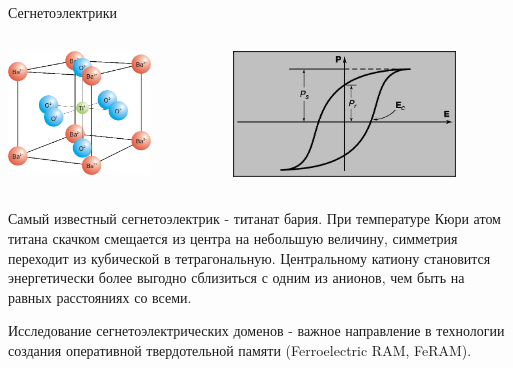 \documentclass[9pt, compress, xcolor=table]{beamer}
\begin{document}
\begin{frame}{Сегнетоэлектрики}
\begin{columns}
\column{6.5cm}
\begin{center}
\includegraphics[width=0.7\textwidth]{shg27}
\end{center}
\column{6.5cm}
\begin{center}
\includegraphics[width=0.8\textwidth]{shg28}
\end{center}

\end{columns}

Самый известный сегнетоэлектрик - титанат бария. При температуре Кюри атом титана скачком смещается из центра на небольшую величину, симметрия переходит из кубической в тетрагональную. Центральному катиону становится энергетически более выгодно сблизиться с одним из анионов, чем быть на равных расстояниях со всеми.  

Исследование сегнетоэлектрических доменов - важное направление в технологии создания оперативной твердотельной памяти (Ferroelectric RAM, FeRAM).

\end{frame}
\end{document}
